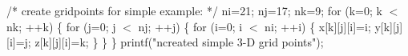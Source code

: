 \documentclass[12pt]{article}
\begin{document}
{\noindent /* create gridpoints for simple example: */
\newline\indent  ni=21;
\newline\indent  nj=17;
\newline\indent  nk=9;
\newline\indent  for (k=0; k $<$ nk; ++k)
\newline\indent  \{
\newline\indent\indent     for (j=0; j $<$ nj; ++j)
\newline\indent\indent     \{
\newline\indent\indent\indent        for (i=0; i $<$ ni; ++i)
\newline\indent\indent\indent        \{
\newline\indent\indent\indent\indent           x[k][j][i]=i;
\newline\indent\indent\indent\indent           y[k][j][i]=j;
\newline\indent\indent\indent\indent           z[k][j][i]=k;
\newline\indent\indent\indent        \}
\newline\indent\indent     \}
\newline\indent  \}
\newline\indent printf("\texttt{}ncreated simple 3-D grid points");

}
\end{document}
